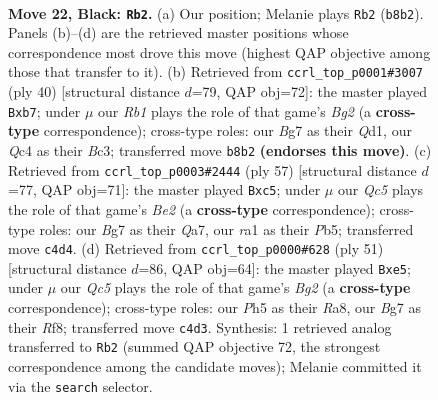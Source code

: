 \documentclass[11pt]{article}
\begin{document}
\clearpage

\begin{figure}[p]\centering
\begin{subfigure}{0.46\textwidth}\centering
\resizebox{\linewidth}{!}{%
\newchessgame
\chessboard[
  setfen={1r3rk1/p2b1pb1/2pp4/7p/P1qNp2P/8/5BK1/R2Q3R b - - 1 22},
  showmover=false,
  pgfstyle=straightmove, color=movearrow, markmove={b8-b2}
]}
\caption{}
\end{subfigure}\hfill
\begin{subfigure}{0.46\textwidth}\centering
\resizebox{\linewidth}{!}{%
\newchessgame
\chessboard[
  setfen={2r2rk1/pp3pb1/3q2p1/7p/3n4/1PB3PP/P4PB1/2RQ1RK1 w - - 0 21},
  showmover=false,
  pgfstyle=straightmove, color=movearrow, markmove={g2-b7}
]}
\caption{}
\end{subfigure}
\\[4pt]
\begin{subfigure}{0.46\textwidth}\centering
\resizebox{\linewidth}{!}{%
\newchessgame
\chessboard[
  setfen={3rr1k1/q3bppp/2p5/PpN1P3/4pP2/4Q2P/P5PK/2R1R3 b - - 1 29},
  showmover=false,
  pgfstyle=straightmove, color=movearrow, markmove={e7-c5}
]}
\caption{}
\end{subfigure}\hfill
\begin{subfigure}{0.46\textwidth}\centering
\resizebox{\linewidth}{!}{%
\newchessgame
\chessboard[
  setfen={r4rk1/pp4bp/4p1p1/2PqN3/R3nB2/7P/1P2B1P1/2Q2R1K b - - 2 26},
  showmover=false,
  pgfstyle=straightmove, color=movearrow, markmove={g7-e5}
]}
\caption{}
\end{subfigure}
\caption{\textbf{Move 22, Black: \texttt{Rb2}.} (a) Our position; Melanie plays \texttt{Rb2} (\texttt{b8b2}). Panels (b)--(d) are the retrieved master positions whose correspondence most drove this move (highest QAP objective among those that transfer to it). (b) Retrieved from \texttt{ccrl\_top\_p0001\#3007} (ply 40) [structural distance $d$=79, QAP obj=72]: the master played \texttt{Bxb7}; under $\mu$ our \emph{Rb1} plays the role of that game's \emph{Bg2} (a \textbf{cross-type} correspondence); cross-type roles: our \emph{B}g7 as their \emph{Q}d1, our \emph{Q}c4 as their \emph{B}c3; transferred move \texttt{b8b2} \textbf{(endorses this move)}. (c) Retrieved from \texttt{ccrl\_top\_p0003\#2444} (ply 57) [structural distance $d$=77, QAP obj=71]: the master played \texttt{Bxc5}; under $\mu$ our \emph{Qc5} plays the role of that game's \emph{Be2} (a \textbf{cross-type} correspondence); cross-type roles: our \emph{B}g7 as their \emph{Q}a7, our \emph{r}a1 as their \emph{P}b5; transferred move \texttt{c4d4}. (d) Retrieved from \texttt{ccrl\_top\_p0000\#628} (ply 51) [structural distance $d$=86, QAP obj=64]: the master played \texttt{Bxe5}; under $\mu$ our \emph{Qc5} plays the role of that game's \emph{Bg2} (a \textbf{cross-type} correspondence); cross-type roles: our \emph{P}h5 as their \emph{R}a8, our \emph{B}g7 as their \emph{R}f8; transferred move \texttt{c4d3}. Synthesis: 1 retrieved analog transferred to \texttt{Rb2} (summed QAP objective 72, the strongest correspondence among the candidate moves); Melanie committed it via the \texttt{search} selector.}
\label{fig:thought-m43}
\end{figure}
\end{document}
